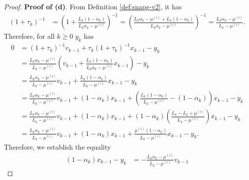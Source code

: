 \documentclass[12pt]{article}
\begin{document}
\begin{proof}
            \par
            \textbf{Proof of (d)}.
            From Definition \ref{def:snapg-v2}, it has
            \begin{align*}
                (1 + \tau_k)^{-1}
                &=
                \left(
                    1 + \frac{L_k(1 - \alpha_k)}{L_k\alpha_k - \mu^{(i)}}
                \right)^{-1} = \left(
                    \frac{L_k\alpha_k - \mu^{(i)} + L_k(1 - \alpha_k)}{L_k\alpha_k - \mu^{(i)}}
                \right)^{-1}
                = \frac{L_k\alpha_k - \mu^{(i)}}{L_k - \mu^{(i)}}. 
            \end{align*}
            Therefore, for all $k \ge 0$ $y_k$ has 
            \begin{align*}
                0 &= (1 + \tau_k)^{-1} v_{k - 1} + \tau_k (1 + \tau_k)^{-1} x_{k - 1} - y_k
                \\
                &= \frac{L_k\alpha_k - \mu^{(i)}}{L_k - \mu^{(i)}} 
                \left(
                    v_{k - 1} + \frac{L_k(1 - \alpha_k)}{L_k\alpha_k - \mu^{(i)}} x_{k - 1}
                \right) - y_k
                \\
                &= \frac{L_k\alpha_k - \mu^{(i)}}{L_k - \mu^{(i)}} v_{k - 1}
                + \frac{L_k(1 - \alpha_k)}{L_k - \mu^{(i)}} x_{k - 1} - y_k
                \\
                &= \frac{L_k\alpha_k - \mu^{(i)}}{L_k - \mu^{(i)}} v_{k - 1} + (1 - \alpha_k)x_{k - 1}
                + 
                \left(
                    \frac{L_k(1 - \alpha_k)}{L_k - \mu^{(i)}} - (1 - \alpha_k)
                \right) x_{k - 1} - y_k
                \\
                &= \frac{L_k\alpha_k - \mu^{(i)}}{L_k - \mu^{(i)}} v_{k - 1} + (1 - \alpha_k)x_{k - 1}
                + 
                (1 - \alpha_k)\left(
                    \frac{L_k - L_k + \mu^{(i)}}{L_k - \mu^{(i)}}
                \right) x_{k - 1} - y_k
                \\
                &= \frac{L_k\alpha_k - \mu^{(i)}}{L_k - \mu^{(i)}} v_{k - 1} + (1 - \alpha_k)x_{k - 1}
                + 
                \frac{\mu^{(i)}(1 - \alpha_k)}{L_k - \mu^{(i)}}x_{k - 1} - y_k. 
            \end{align*}
            Therefore, we establish the equality 
            \begin{align*}
                (1 - \alpha_k)x_{k - 1} - y_k &= 
                - \frac{L_k\alpha_k - \mu^{(i)}}{L_k - \mu^{(i)}} v_{k - 1} 

\end{align*}
\end{proof}
\end{document}
